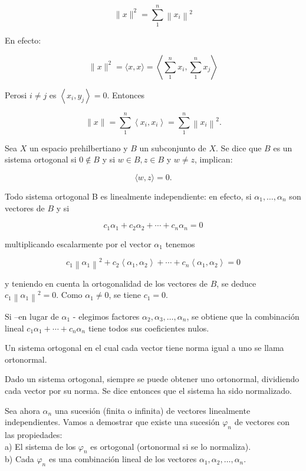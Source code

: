 \documentclass[10pt]{article}
\theoremstyle{plain}
\theoremstyle{definition}
\theoremstyle{remark}
\begin{document}
$$
\|x\|^{2}=\sum_{1}^{n}\left\|x_{i}\right\|^{2}
$$

En efecto:

$$
\|x\|^{2}=\langle x, x\rangle=\left\langle\sum_{1}^{n} x_{i}, \sum_{1}^{n} x_{j}\right\rangle
$$

Perosi $i \neq j$ es $\left\langle x_{i}, y_{j}\right\rangle=0$. Entonces

$$
\|x\|=\sum_{1}^{n}\left\langle x_{i}, x_{i}\right\rangle=\sum_{1}^{n}\left\|x_{i}\right\|^{2} .
$$

Sea $X$ un espacio prehilbertiano y $B$ un subconjunto de $X$. Se dice que $B$ es un sistema ortogonal si $0 \notin B$ y si $w \in B, z \in B$ y $w \neq z$, implican:


\begin{equation*}
\langle w, z\rangle=0 . \tag{3-6}
\end{equation*}


Todo sistema ortogonal B es linealmente independiente: en efecto, si $\alpha_{1}, \ldots, \alpha_{n}$ son vectores de $B$ y si

$$
c_{1} \alpha_{1}+c_{2} \alpha_{2}+\cdots+c_{n} \alpha_{n}=0
$$

multiplicando escalarmente por el vector $\alpha_{1}$ tenemos

$$
c_{1}\left\|\alpha_{1}\right\|^{2}+c_{2}\left\langle\alpha_{1}, \alpha_{2}\right\rangle+\cdots+c_{n}\left\langle\alpha_{1}, \alpha_{2}\right\rangle=0
$$

y teniendo en cuenta la ortogonalidad de los vectores de $B$, se deduce $c_{1}\left\|\alpha_{1}\right\|^{2}=0$. Como $\alpha_{1} \neq 0$, se tiene $c_{1}=0$.

Si --en lugar de $\alpha_{1}$ - elegimos factores $\alpha_{2}, \alpha_{3}, \ldots, \alpha_{n}$, se obtiene que la combinación lineal $c_{1} \alpha_{1}+\cdots+c_{n} \alpha_{n}$ tiene todos sus coeficientes nulos.

Un sistema ortogonal en el cual cada vector tiene norma igual a uno se llama ortonormal.

Dado un sistema ortogonal, siempre se puede obtener uno ortonormal, dividiendo cada vector por su norma. Se dice entonces que el sistema ha sido normalizado.

Sea ahora $\alpha_{n}$ una sucesión (finita o infinita) de vectores linealmente independientes. Vamos a demostrar que existe una sucesión $\varphi_{n}$ de vectores con las propiedades:\\
a) El sistema de los $\varphi_{n}$ es ortogonal (ortonormal si se lo normaliza).\\
b) Cada $\varphi_{n}$ es una combinación lineal de los vectores $\alpha_{1}, \alpha_{2}, \ldots, \alpha_{n}$.
\end{document}
